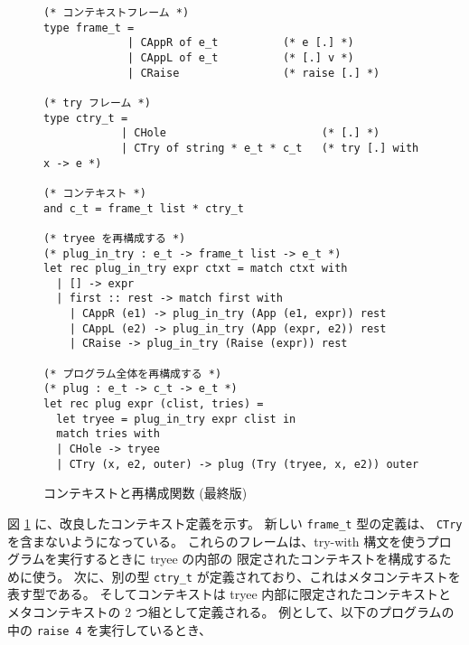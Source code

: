 \begin{figure}
\begin{spacing}{0.8}
\begin{verbatim}
(* コンテキストフレーム *)
type frame_t = 
             | CAppR of e_t          (* e [.] *)
             | CAppL of e_t          (* [.] v *)
             | CRaise                (* raise [.] *)

(* try フレーム *)
type ctry_t = 
            | CHole                        (* [.] *)
            | CTry of string * e_t * c_t   (* try [.] with x -> e *)

(* コンテキスト *)
and c_t = frame_t list * ctry_t

(* tryee を再構成する *)
(* plug_in_try : e_t -> frame_t list -> e_t *)
let rec plug_in_try expr ctxt = match ctxt with
  | [] -> expr
  | first :: rest -> match first with
    | CAppR (e1) -> plug_in_try (App (e1, expr)) rest
    | CAppL (e2) -> plug_in_try (App (expr, e2)) rest
    | CRaise -> plug_in_try (Raise (expr)) rest

(* プログラム全体を再構成する *)
(* plug : e_t -> c_t -> e_t *)
let rec plug expr (clist, tries) =
  let tryee = plug_in_try expr clist in
  match tries with
  | CHole -> tryee
  | CTry (x, e2, outer) -> plug (Try (tryee, x, e2)) outer
\end{verbatim}
\end{spacing}
  \caption{コンテキストと再構成関数 (最終版)}
  \label{figure:typec}
\end{figure}

図 \ref{figure:typec} に、改良したコンテキスト定義を示す。
新しい \texttt{frame\_t} 型の定義は、 \texttt{CTry} を含まないようになっている。
これらのフレームは、try-with 構文を使うプログラムを実行するときに tryee の内部の
限定されたコンテキストを構成するために使う。
次に、別の型 \texttt{ctry\_t} が定義されており、これはメタコンテキストを表す型である。
そしてコンテキストは tryee 内部に限定されたコンテキストとメタコンテキストの 2 つ組として定義される。
例として、以下のプログラムの中の \texttt{raise 4} を実行しているとき、

